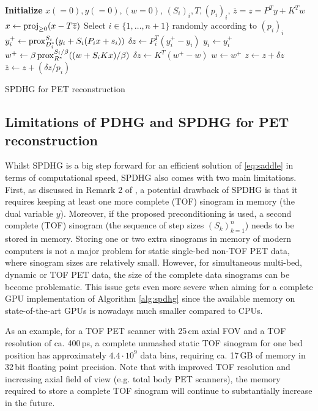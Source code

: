 \begin{algorithm}[t]
\begin{algorithmic}[1]
\small
\State \textbf{Initialize} $x(=0),y(=0),(w=0)$, $(S_i)_i,T,(p_i)_i$,
\State $\overline{z} = z = P^T y + K^T w$
\Repeat
	\State $x \gets \operatorname{proj}_{\geq 0} (x - T \overline{z})$
	\State Select $i \in \{ 1,\ldots,n+1\} $ randomly according to $(p_i)_i$
	\State $y_i^+ \gets \operatorname{prox}_{D_i^*}^{S_i} ( y_i + S_i  ( P_i x + s_i))$
	\State $\delta z \gets P_i^T (y_i^+ - y_i)$
	\State $y_i \gets y_i^+$
  \Else
	\State $w^+ \gets \beta \operatorname{prox}_{R^*}^{S_i/\beta} ((w + S_i  K x)/\beta)$
	\State $\delta z \gets K^T (w^+ - w)$
	\State $w \gets w^+$
  \EndIf
	\State $z \gets z + \delta z$
	\State $\overline{z} \gets  z + (\delta z/p_i)$
\State {}
\end{algorithmic}
\caption{SPDHG for PET reconstruction \cite{Ehrhardt2019}}
\label{alg:spdhg}
\end{algorithm}
%

\subsection*{Limitations of PDHG and SPDHG for PET reconstruction}

Whilst SPDHG is a big step forward for an efficient solution of \eqref{eq:saddle}
in terms of computational speed, SPDHG also comes with two main limitations.
First, as discussed in Remark 2 of \cite{Ehrhardt2019}, 
a potential drawback of SPDHG is that it requires keeping at least one more complete 
(TOF) sinogram in memory (the dual variable $y$). 
Moreover, if the proposed preconditioning is used, a second complete (TOF) sinogram
(the sequence of step sizes $(S_k)_{k=1}^n$) needs to be stored in memory.
Storing one or two extra sinograms in memory of modern computers is not a major problem for static 
single-bed non-TOF PET data, where sinogram sizes are relatively small.
However, for simultaneous multi-bed, dynamic or TOF PET data, the size of the complete data sinograms
can be become problematic.
This issue gets even more severe when aiming for a complete GPU implementation 
of Algorithm \ref{alg:spdhg} since the available memory on state-of-the-art GPUs is nowadays
much smaller compared to CPUs.

As an example, for a TOF PET scanner with 25\,cm axial FOV and a TOF resolution of ca. 400\,ps, 
a complete unmashed static TOF sinogram for one bed position 
has approximately $4.4\cdot10^9$ data bins, requiring ca. 17\,GB of memory in 32\,bit floating
point precision.
Note that with improved TOF resolution and increasing axial field of view (e.g. total body 
PET scanners), the memory required to store a complete TOF sinogram will continue to 
substantially increase in the future.

